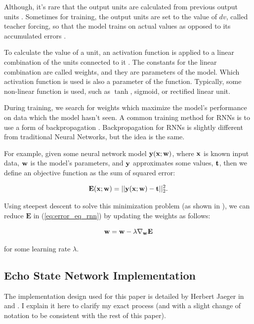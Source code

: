 \documentclass{article}
\begin{document}
Although, it's rare that the output units are calculated from previous output
units \cite{jaeger2002tutorial}. Sometimes for training, the output units are
set to the value of $dv$, called teacher forcing, so that the model trains on
actual values as opposed to its accumulated errors \cite{jaeger2002tutorial}.

To calculate the value of a unit, an activation function is applied to a
linear combination of the units connected to it
\cite{svozil1997introduction}. The constants for the linear combination are
called weights, and they are parameters of the model. Which activation
function is used is also a parameter of the function. Typically, some
non-linear function is used, such as $\tanh$, sigmoid, or rectified linear
unit.

During training, we search for weights which maximize the model's performance
on data which the model hasn't seen. A common training method for RNNs is to
use a form of backpropagation \cite{jaeger2002tutorial}. Backpropagation for
RNNs is slightly different from traditional Neural Networks, but the idea is
the same.

For example, given some neural network model $\mathbf{y}(\mathbf{x}; \mathbf{w})$, where $\mathbf{x}$ is
known input data, $\mathbf{w}$ is the model's parameters, and $\mathbf{y}$ approximates
some values, $\mathbf{t}$, then we define an objective function as the sum of
squared error:

\newcommand{\Ev}{\mathbf{E}}

\begin{equation}
    \Ev(\xv; \wv) = \vert \vert \yv(\xv; \wv) - \tv \vert \vert_2^2.
    \label{eq:error_eq_rnn}
\end{equation}

Using steepest descent to solve this minimization problem (as shown in
\cite{svozil1997introduction}), we can reduce $\Ev$ in
(\ref{eq:error_eq_rnn}) by updating the weights as follows:

\begin{equation}
    \wv = \wv - \lambda \nabla_\wv \Ev
\end{equation}

for some learning rate $\lambda$.

\subsection{Echo State Network Implementation}

The implementation design used for this paper is detailed by Herbert Jaeger
in \cite{jaeger2002tutorial} and \cite{jaeger2007echo}. I explain it here to
clarify my exact process (and with a slight change of notation to be
consistent with the rest of this paper).
\end{document}

